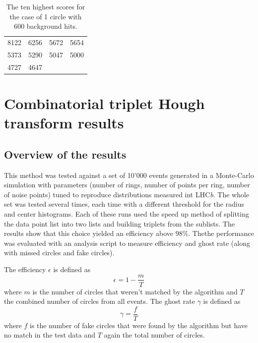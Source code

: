 \documentclass[11pt,twoside]{scrreprt}
\begin{document}

\begin{table}[ht]
\centering
\caption[Circle scores for 1 circle 600 background hits]{The ten highest scores for the case of 1 circle with 600 background hits.}
\label{tab:3d_10_high_scores}
\begin{tabular}{c|c|c|c}
\toprule
8122 & 6256 & 5672 & 5654 \\
5373 & 5290 & 5047 & 5000 \\
4727 & 4647 &  &  \\
\bottomrule
\end{tabular}
\end{table}




\section{Combinatorial triplet Hough transform results} %
\label{sec:combinatorial_approach_results}

\subsection{Overview of the results} %
\label{sub:overview_of_the_results}

This method was tested against a set of 10'000 events generated in a Monte-Carlo simulation with parameters (number of rings, 
number of points per ring, number of noise points) tuned to reproduce distributions measured int LHC\textit{b}. 
The whole set was tested several times, each time with a different threshold for the radius and center histograms. 
Each of these runs used the speed up method of splitting the data point list into two lists and building triplets from 
the sublists. The results show that this choice yielded an efficiency above $98\%$. 
Thethe performance was evaluated with an analysis script to measure efficiency and ghost rate (along with missed 
circles and fake circles).

The efficiency $\epsilon$ is defined as 
\begin{equation}
\epsilon = 1 - \frac{m}{T}    
\end{equation}
where $m$ is the number of circles that weren't matched by the algorithm and $T$ the combined number of circles from
all events. The ghost rate $\gamma$ is defined as 
\begin{equation}
  \gamma = \frac{f}{T} 
\end{equation}
where $f$ is the number of fake circles that were found by the algorithm but have no match in the test data and $T$ again the
total number of circles.
\end{document}

